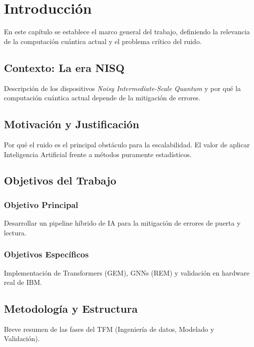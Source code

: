 \chapter{Introducción}
\label{cap:intro}

En este capítulo se establece el marco general del trabajo, definiendo la relevancia de la computación cuántica actual y el problema crítico del ruido.

\section{Contexto: La era NISQ}
Descripción de los dispositivos \textit{Noisy Intermediate-Scale Quantum} y por qué la computación cuántica actual depende de la mitigación de errores.

\section{Motivación y Justificación}
Por qué el ruido es el principal obstáculo para la escalabilidad. El valor de aplicar Inteligencia Artificial frente a métodos puramente estadísticos.

\section{Objetivos del Trabajo}
\subsection{Objetivo Principal}
Desarrollar un pipeline híbrido de IA para la mitigación de errores de puerta y lectura.
\subsection{Objetivos Específicos}
Implementación de Transformers (GEM), GNNs (REM) y validación en hardware real de IBM.

\section{Metodología y Estructura}
Breve resumen de las fases del TFM (Ingeniería de datos, Modelado y Validación).